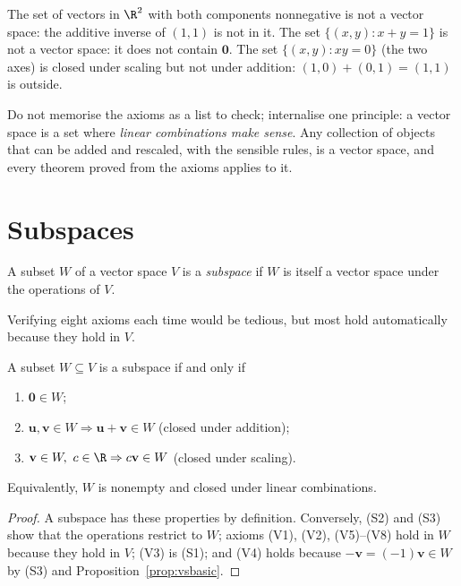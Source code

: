 \begin{example}
The set of vectors in $\R^2$ with both components nonnegative is not a vector space: the additive inverse of $(1,1)$ is not in it. The set $\{(x,y):x+y=1\}$ is not a vector space: it does not contain $\mathbf{0}$. The set $\{(x,y):xy=0\}$ (the two axes) is closed under scaling but not under addition: $(1,0)+(0,1)=(1,1)$ is outside.
\end{example}

\begin{intuition}
Do not memorise the axioms as a list to check; internalise one principle: a vector space is a set where \emph{linear combinations make sense}. Any collection of objects that can be added and rescaled, with the sensible rules, is a vector space, and every theorem proved from the axioms applies to it.
\end{intuition}

\section{Subspaces}

\begin{definition}[Subspace]
A subset $W$ of a vector space $V$ is a \emph{subspace} if $W$ is itself a vector space under the operations of $V$.
\end{definition}

Verifying eight axioms each time would be tedious, but most hold automatically because they hold in $V$.

\begin{theorem}\label{thm:subtest}
A subset $W\subseteq V$ is a subspace if and only if
\begin{enumerate}[label=(S\arabic*)]
  \item $\mathbf{0}\in W$;
  \item $\mathbf{u},\mathbf{v}\in W\Rightarrow\mathbf{u}+\mathbf{v}\in W$ (closed under addition);
  \item $\mathbf{v}\in W,\ c\in\R\Rightarrow c\mathbf{v}\in W$ (closed under scaling).
\end{enumerate}
Equivalently, $W$ is nonempty and closed under linear combinations.
\end{theorem}

\begin{proof}
A subspace has these properties by definition. Conversely, (S2) and (S3) show that the operations restrict to $W$; axioms (V1), (V2), (V5)--(V8) hold in $W$ because they hold in $V$; (V3) is (S1); and (V4) holds because $-\mathbf{v}=(-1)\mathbf{v}\in W$ by (S3) and Proposition~\ref{prop:vsbasic}.
\end{proof}

